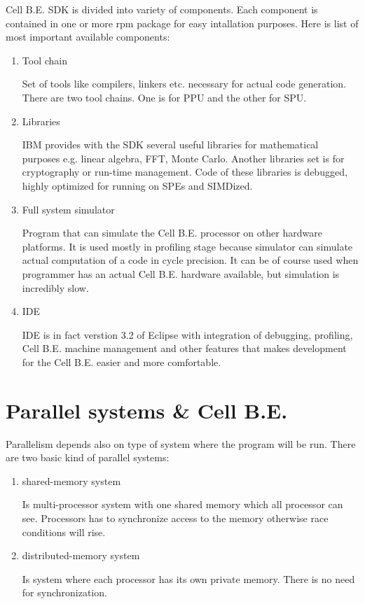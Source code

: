Cell B.E. SDK is divided into variety of components.
Each component is contained in one or more rpm package for easy intallation purposes.
Here is list of most important available components:
\begin{enumerate}
  \item {Tool chain}
  \par
  Set of tools like compilers, linkers etc. necessary for actual code generation.
There are two tool chains.
One is for PPU and the other for SPU.

  \item {Libraries}
  \par
  IBM provides with the SDK several useful libraries for mathematical purposes e.g. linear algebra, FFT, Monte Carlo.
Another libraries set is for cryptography or run-time management.
Code of these libraries is debugged, highly optimized for running on SPEs and SIMDized.

  \item {Full system simulator}
  \par
  Program that can simulate the Cell B.E. processor on other hardware platforms.
It is used mostly in profiling stage because simulator can simulate actual computation of a code in cycle precision.
It can be of course used when programmer has an actual Cell B.E. hardware available, but simulation is incredibly slow.

  \item {IDE}
  \par
  IDE is in fact verstion 3.2 of Eclipse with integration of debugging, profiling, Cell B.E. machine management and other features that makes development for the Cell B.E. easier and more comfortable.
\end{enumerate}


\section{Parallel systems \& Cell B.E.}

Parallelism depends also on type of system where the program will be run.
There are two basic kind of parallel systems:
\begin{enumerate}
\item {shared-memory system}
\par
Is multi-processor system with one shared memory which all processor can see.
Processors has to synchronize access to the memory otherwise race conditions will rise.

\item {distributed-memory system}
\par
Is system where each processor has its own private memory.
There is no need for synchronization.
\end{enumerate}

